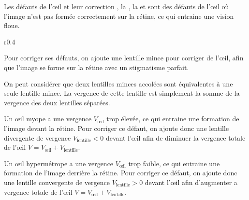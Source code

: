 \pasCorrection{\newpage\vspace*{-36pt}}
\begin{doc}{Les défauts de l'œil et leur correction}
  , la , la  et  sont des défauts de l'œil où l'image n'est pas formée correctement sur la rétine, ce qui entraine une vision floue.

  \begin{wrapfigure}[10]{r}{0.4\linewidth}
    \centering
    \vspace*{-2pt}
    
    
  \end{wrapfigure}
  
  Pour corriger ses défauts, on ajoute une lentille mince pour corriger  de l'œil, afin que l'image se forme sur la rétine avec un stigmatisme parfait.

  \begin{importants}
    On peut considérer que deux lentilles minces accolées sont équivalentes à une seule lentille mince.
    La vergence de cette lentille est simplement la somme de la vergence des deux lentilles séparées.
  \end{importants}

  \pointCyan {}

  Un œil myope a une vergence $V_\text{œil}$ trop élevée, ce qui entraine une formation de l'image devant la rétine.
  Pour corriger ce défaut, on ajoute donc une lentille divergente de vergence $V_\text{lentille} < 0$ devant l'œil afin de diminuer la vergence totale de l'œil $V = V_\text{œil} + V_\text{lentille}$.

  \pointCyan {}

  Un œil hypermétrope a une vergence $V_\text{œil}$ trop faible, ce qui entraine une formation de l'image derrière la rétine.
  Pour corriger ce défaut, on ajoute donc une lentille convergente de vergence $V_\text{lentille} > 0$ devant l'œil afin d'augmenter a vergence totale de l'œil $V = V_\text{œil} + V_\text{lentille}$.

  \pointCyan {}


\end{doc}
